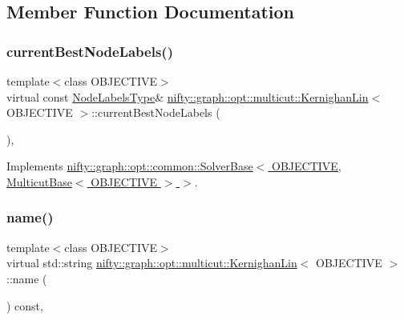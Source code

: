 \subsection{Member Function Documentation}
\mbox{\label{classnifty_1_1graph_1_1opt_1_1multicut_1_1KernighanLin_ae7382c0fc906c39ecf546ff84dede91f}} 
\subsubsection{\texorpdfstring{current\+Best\+Node\+Labels()}{currentBestNodeLabels()}}
{\footnotesize\ttfamily template$<$class O\+B\+J\+E\+C\+T\+I\+VE$>$ \\
virtual const \hyperlink{classnifty_1_1graph_1_1opt_1_1multicut_1_1KernighanLin_acc82419d254c543b753b17fd26ef0818}{Node\+Labels\+Type}\& \hyperlink{classnifty_1_1graph_1_1opt_1_1multicut_1_1KernighanLin}{nifty\+::graph\+::opt\+::multicut\+::\+Kernighan\+Lin}$<$ O\+B\+J\+E\+C\+T\+I\+VE $>$\+::current\+Best\+Node\+Labels (\begin{DoxyParamCaption}{ }\end{DoxyParamCaption})\hspace{0.3cm}{\ttfamily [inline]}, {\ttfamily [virtual]}}



Implements \hyperlink{classnifty_1_1graph_1_1opt_1_1common_1_1SolverBase_a7bbe01ee201cf3157b251e54c5ff0619}{nifty\+::graph\+::opt\+::common\+::\+Solver\+Base$<$ O\+B\+J\+E\+C\+T\+I\+V\+E, Multicut\+Base$<$ O\+B\+J\+E\+C\+T\+I\+V\+E $>$ $>$}.

\mbox{\label{classnifty_1_1graph_1_1opt_1_1multicut_1_1KernighanLin_a0e6302dd8fad769a31a8cea2df10465f}} 
\subsubsection{\texorpdfstring{name()}{name()}}
{\footnotesize\ttfamily template$<$class O\+B\+J\+E\+C\+T\+I\+VE$>$ \\
virtual std\+::string \hyperlink{classnifty_1_1graph_1_1opt_1_1multicut_1_1KernighanLin}{nifty\+::graph\+::opt\+::multicut\+::\+Kernighan\+Lin}$<$ O\+B\+J\+E\+C\+T\+I\+VE $>$\+::name (\begin{DoxyParamCaption}{ }\end{DoxyParamCaption}) const\hspace{0.3cm}{\ttfamily [inline]}, {\ttfamily [virtual]}}



